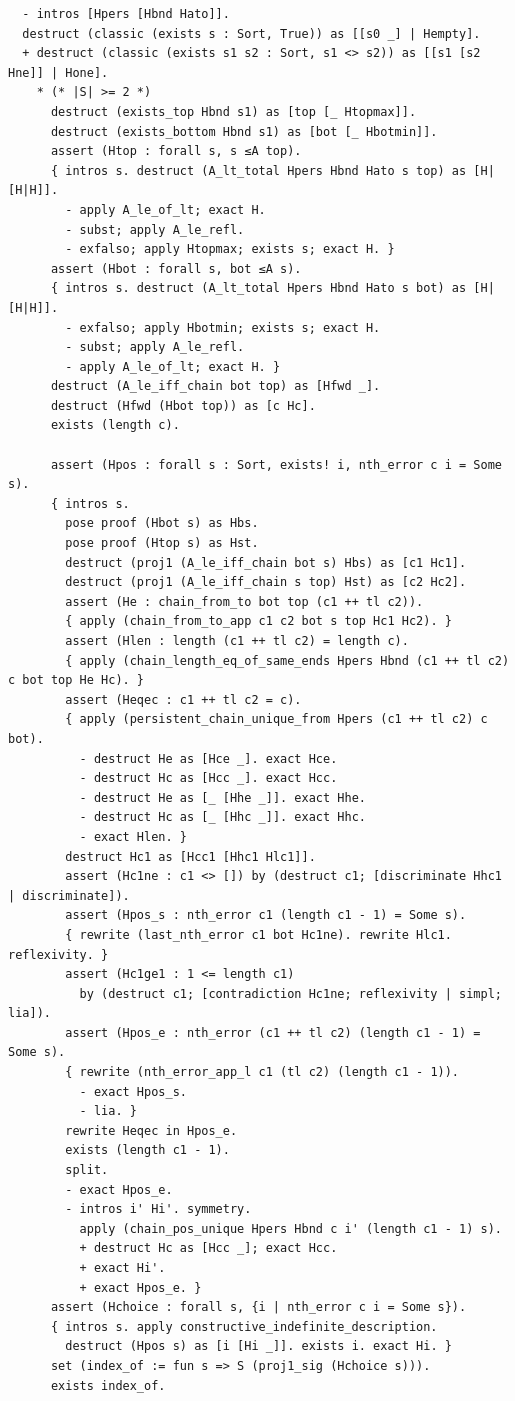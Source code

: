 \begin{latin}
\begin{verbatim}
  - intros [Hpers [Hbnd Hato]].
  destruct (classic (exists s : Sort, True)) as [[s0 _] | Hempty].
  + destruct (classic (exists s1 s2 : Sort, s1 <> s2)) as [[s1 [s2 Hne]] | Hone].
    * (* |S| >= 2 *)
      destruct (exists_top Hbnd s1) as [top [_ Htopmax]].
      destruct (exists_bottom Hbnd s1) as [bot [_ Hbotmin]].
      assert (Htop : forall s, s ≤A top).
      { intros s. destruct (A_lt_total Hpers Hbnd Hato s top) as [H|[H|H]].
        - apply A_le_of_lt; exact H.
        - subst; apply A_le_refl.
        - exfalso; apply Htopmax; exists s; exact H. }
      assert (Hbot : forall s, bot ≤A s).
      { intros s. destruct (A_lt_total Hpers Hbnd Hato s bot) as [H|[H|H]].
        - exfalso; apply Hbotmin; exists s; exact H.
        - subst; apply A_le_refl.
        - apply A_le_of_lt; exact H. }
      destruct (A_le_iff_chain bot top) as [Hfwd _].
      destruct (Hfwd (Hbot top)) as [c Hc].
      exists (length c).

      assert (Hpos : forall s : Sort, exists! i, nth_error c i = Some s).
      { intros s.
        pose proof (Hbot s) as Hbs.
        pose proof (Htop s) as Hst.
        destruct (proj1 (A_le_iff_chain bot s) Hbs) as [c1 Hc1].
        destruct (proj1 (A_le_iff_chain s top) Hst) as [c2 Hc2].
        assert (He : chain_from_to bot top (c1 ++ tl c2)).
        { apply (chain_from_to_app c1 c2 bot s top Hc1 Hc2). }
        assert (Hlen : length (c1 ++ tl c2) = length c).
        { apply (chain_length_eq_of_same_ends Hpers Hbnd (c1 ++ tl c2) c bot top He Hc). }
        assert (Heqec : c1 ++ tl c2 = c).
        { apply (persistent_chain_unique_from Hpers (c1 ++ tl c2) c bot).
          - destruct He as [Hce _]. exact Hce.
          - destruct Hc as [Hcc _]. exact Hcc.
          - destruct He as [_ [Hhe _]]. exact Hhe.
          - destruct Hc as [_ [Hhc _]]. exact Hhc.
          - exact Hlen. }
        destruct Hc1 as [Hcc1 [Hhc1 Hlc1]].
        assert (Hc1ne : c1 <> []) by (destruct c1; [discriminate Hhc1 | discriminate]).
        assert (Hpos_s : nth_error c1 (length c1 - 1) = Some s).
        { rewrite (last_nth_error c1 bot Hc1ne). rewrite Hlc1. reflexivity. }
        assert (Hc1ge1 : 1 <= length c1)
          by (destruct c1; [contradiction Hc1ne; reflexivity | simpl; lia]).
        assert (Hpos_e : nth_error (c1 ++ tl c2) (length c1 - 1) = Some s).
        { rewrite (nth_error_app_l c1 (tl c2) (length c1 - 1)).
          - exact Hpos_s.
          - lia. }
        rewrite Heqec in Hpos_e.
        exists (length c1 - 1).
        split.
        - exact Hpos_e.
        - intros i' Hi'. symmetry.
          apply (chain_pos_unique Hpers Hbnd c i' (length c1 - 1) s).
          + destruct Hc as [Hcc _]; exact Hcc.
          + exact Hi'.
          + exact Hpos_e. }
      assert (Hchoice : forall s, {i | nth_error c i = Some s}).
      { intros s. apply constructive_indefinite_description.
        destruct (Hpos s) as [i [Hi _]]. exists i. exact Hi. }
      set (index_of := fun s => S (proj1_sig (Hchoice s))).
      exists index_of. 
      

\end{verbatim}
\end{latin}
